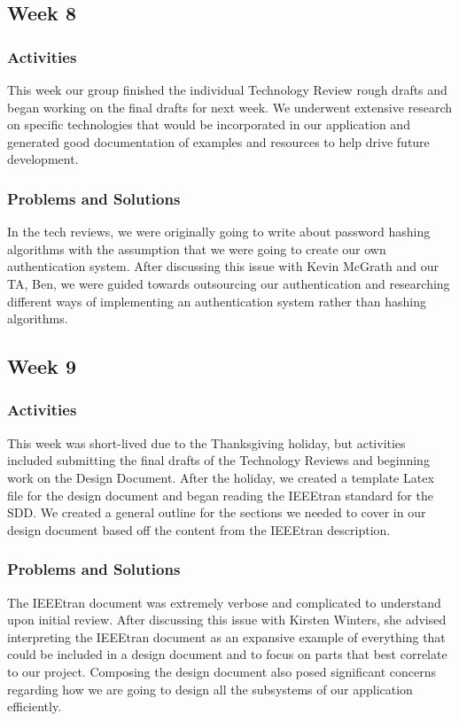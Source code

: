 \documentclass[journal,10pt,onecolumn,compsoc]{IEEEtran} \usepackage[margin=1.0in]{geometry} \usepackage{pdfpages}
\begin{document}
    \subsection{Week 8}
    \subsubsection{Activities}  
    This week our group finished the individual Technology Review rough drafts and began working on the final drafts for next week. We underwent extensive research on specific technologies that would be incorporated in our application and generated good documentation of examples and resources to help drive future development.
    \subsubsection{Problems and Solutions} 
    In the tech reviews, we were originally going to write about password hashing algorithms with the assumption that we were going to create our own authentication system. After discussing this issue with Kevin McGrath and our TA, Ben, we were guided towards outsourcing our authentication and researching different ways of implementing an authentication system rather than hashing algorithms.
    \subsection{Week 9}
    \subsubsection{Activities} 
    This week was short-lived due to the Thanksgiving holiday, but activities included submitting the final drafts of the Technology Reviews and beginning work on the Design Document. After the holiday, we created a template Latex file for the design document and began reading the IEEEtran standard for the SDD. We created a general outline for the sections we needed to cover in our design document based off the content from the IEEEtran description.
    \subsubsection{Problems and Solutions} 
    The IEEEtran document was extremely verbose and complicated to understand upon initial review. After discussing this issue with Kirsten Winters, she advised interpreting the IEEEtran document as an expansive example of everything that could be included in a design document and to focus on parts that best correlate to our project. Composing the design document also posed significant concerns regarding how we are going to design all the subsystems of our application efficiently.
\end{document}
